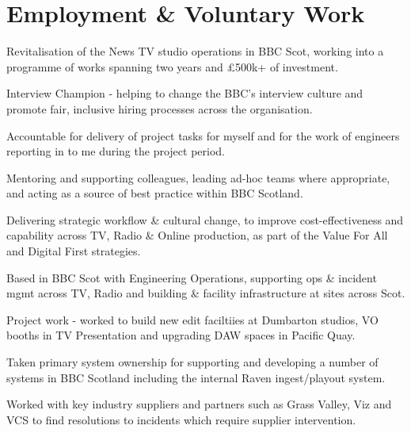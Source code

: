 \documentclass[]{deedy-resume-openfont}
\begin{document}
\begin{minipage}[t]{0.66\textwidth} 


\section{Employment \& Voluntary Work}

\vspace{\topsep} %
\begin{tightemize}
\item Revitalisation of the News TV studio operations in BBC Scot, working into a programme of works spanning two years and £500k+ of investment.
\item Interview Champion - helping to change the BBC's interview culture and promote fair, inclusive hiring processes across the organisation.
\item Accountable for delivery of project tasks for myself and for the work of engineers reporting in to me during the project period.
\item Mentoring and supporting colleagues, leading ad-hoc teams where appropriate, and acting as a source of best practice within BBC Scotland.
\item Delivering strategic workflow \& cultural change, to improve cost-effectiveness and capability across TV, Radio \& Online production, as part of the Value For All and Digital First strategies.
\end{tightemize}
\sectionsep

\vspace{\topsep} %
\begin{tightemize}
\item Based in BBC Scot with Engineering Operations, supporting ops \& incident mgmt across TV, Radio and building \& facility infrastructure at sites across Scot.
\item Project work - worked to build new edit faciltiies at Dumbarton studios, VO booths in TV Presentation and upgrading DAW spaces in Pacific Quay.
\item Taken primary system ownership for supporting and developing a number of systems in BBC Scotland including the internal Raven ingest/playout system.
\item Worked with key industry suppliers and partners such as Grass Valley, Viz and VCS to find resolutions to incidents which require supplier intervention. 
\end{tightemize}
\sectionsep


\end{minipage}
\end{document}
